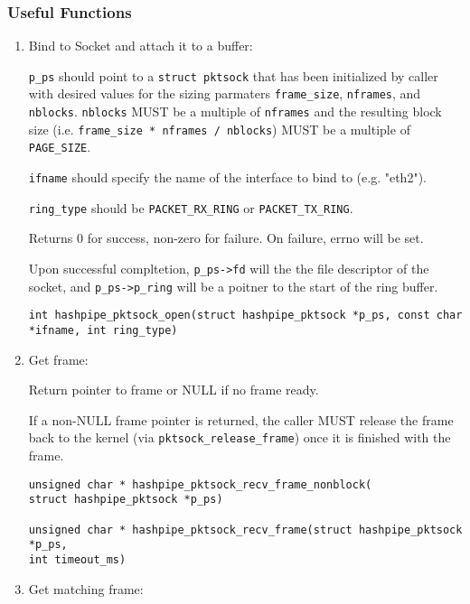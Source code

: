 \documentclass[12pt]{article}
\begin{document}
\subsubsection{Useful Functions}

\begin{enumerate}

\item Bind to Socket and attach it to a buffer: 

{\tt p\_ps} should point to a {\tt struct pktsock} that has been initialized by
caller with desired values for the sizing parmaters {\tt frame\_size}, {\tt nframes},
and {\tt nblocks}.  {\tt nblocks} MUST be a multiple of {\tt nframes} and the resulting
block size (i.e. {\tt frame\_size * nframes / nblocks}) MUST be a multiple of
{\tt PAGE\_SIZE}.

{\tt ifname} should specify the name of the interface to bind to (e.g. "eth2").

{\tt ring\_type} should be {\tt PACKET\_RX\_RING} or {\tt PACKET\_TX\_RING}.

Returns 0 for success, non-zero for failure.  On failure, errno will be set.

Upon successful compltetion, {\tt p\_ps->fd} will the the file descriptor of the
socket, and {\tt p\_ps->p\_ring} will be a poitner to the start of the ring buffer.

\begin{lstlisting}
int hashpipe_pktsock_open(struct hashpipe_pktsock *p_ps, const char *ifname, int ring_type)
\end{lstlisting}

\item Get frame:

Return pointer to frame or NULL if no frame ready.

If a non-NULL frame pointer is returned, the caller MUST release the frame
back to the kernel (via {\tt pktsock\_release\_frame}) once it is finished with
the frame.

\begin{center}
\begin{lstlisting}
unsigned char * hashpipe_pktsock_recv_frame_nonblock(
struct hashpipe_pktsock *p_ps)

unsigned char * hashpipe_pktsock_recv_frame(struct hashpipe_pktsock *p_ps, 
int timeout_ms)
\end{lstlisting}
\end{center}

\item Get matching frame:


\end{enumerate}
\end{document}
